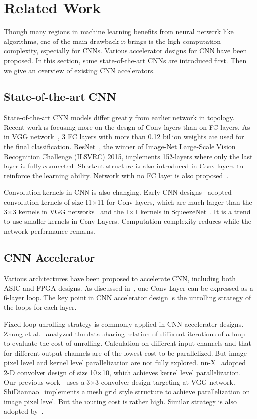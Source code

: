 \documentclass[10pt, conference, compsocconf]{IEEEtran}
\begin{document}
\section{Related Work} \label{sec:related_work}
Though many regions in machine learning benefits from neural network like algorithms, one of the main drawback it brings is the high computation complexity, especially for CNNs. Various accelerator designs for CNN have been proposed. In this section, some state-of-the-art CNNs are introduced first. Then we give an overview of existing CNN accelerators.

\subsection{State-of-the-art CNN}
State-of-the-art CNN models differ greatly from earlier network in topology. Recent work is focusing more on the design of Conv layers than on FC layers. As in VGG network~\cite{simonyan2014very}, 3 FC layers with more than 0.12 billion weights are used for the final classification. ResNet~\cite{he2015deep}, the winner of Image-Net Large-Scale Vision Recognition Challenge (ILSVRC) 2015, implements 152-layers where only the last layer is fully connected. Shortcut structure is also introduced in Conv layers to reinforce the learning ability. Network with no FC layer is also proposed~\cite{long2015fully}.

Convolution kernels in CNN is also changing. Early CNN designs~\cite{krizhevsky2012imagenet}\cite{zeiler2014visualizing} adopted convolution kernels of size 11$\times$11 for Conv layers, which are much larger than the 3$\times$3 kernels in VGG networks~\cite{simonyan2014very} and the 1$\times$1 kernels in SqueezeNet~\cite{iandola2016squeezenet}.  It is a trend to use smaller kernels in Conv Layers. Computation complexity reduces while the network performance remains.

\subsection{CNN Accelerator}
Various architectures have been proposed to accelerate CNN, including both ASIC and FPGA designs. As discussed in~\cite{zhang2015optimizing}, one Conv Layer can be expressed as a 6-layer loop. The key point in CNN accelerator design is the unrolling strategy of the loops for each layer.

Fixed loop unrolling strategy is commonly applied in CNN accelerator designs. Zhang et al.~\cite{zhang2015optimizing} analyzed the data sharing relation of different iterations of a loop to evaluate the cost of unrolling. Calculation on different input channels and that for different output channels are of the lowest cost to be parallelized. But image pixel level and kernel level parallelization are not fully explored. nn-X~\cite{gokhale2014240} adopted 2-D convolver design of size 10$\times$10, which achieves kernel level parallelization. Our previous work~\cite{qiu2016going} uses a 3$\times$3 convolver design targeting at VGG network. ShiDiannao~\cite{du2015shidiannao} implements a mesh grid style structure to achieve parallelization on image pixel level. But the routing cost is rather high. Similar strategy is also adopted by~\cite{sim2016deep}.
\end{document}
